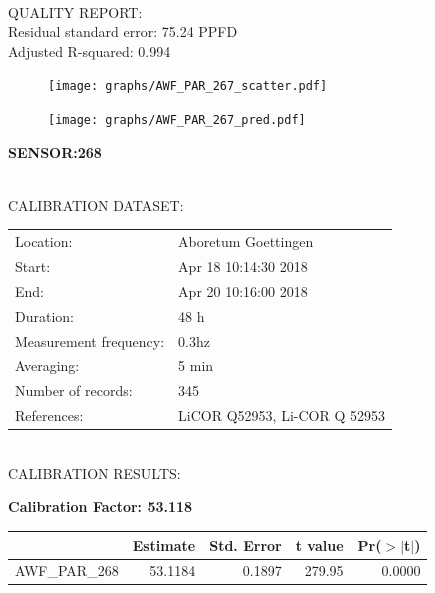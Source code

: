 \documentclass[oneside]{report}
\begin{document}
\hrulefill\\
QUALITY REPORT:\\
Residual standard error: 75.24 PPFD\\
Adjusted R-squared: 0.994



\begin{figure}[H]
  \centering
  \texttt{[image: graphs/AWF\_PAR\_267\_scatter.pdf]}
\end{figure}




\begin{figure}[H]
  \centering
  \texttt{[image: graphs/AWF\_PAR\_267\_pred.pdf]}
\end{figure}

\pagebreak


\begin{center}
\large{\textbf{SENSOR:268}}\\
\end{center}

\hrulefill\\
CALIBRATION DATASET:\\
\begin{table}[h!]
  \centering
  \label{tab:table1}
  \begin{tabular}{ll}
    Location: & Aboretum Goettingen\\ 
    
    
    Start:  & Apr 18 10:14:30 2018 \\
    End:   & Apr 20 10:16:00 2018\\ 
    Duration: & 48 h\\
    Measurement frequency: & 0.3hz\\
    Averaging:  &5 min\\
    Number of records: & 345 \\
    References: & LiCOR Q52953, Li-COR Q 52953 \\
  \end{tabular}
\end{table}

\hrulefill\\
CALIBRATION RESULTS:\\


\begin{center}
\textbf{\large{Calibration Factor: 53.118}}\\
\end{center}
\begin{table}[ht]
\centering
\begin{tabular}{rrrrr}
  \hline
 & Estimate & Std. Error & t value & Pr($>$$|$t$|$) \\ 
  \hline
AWF\_PAR\_268 & 53.1184 & 0.1897 & 279.95 & 0.0000 \\ 
   \hline
\end{tabular}
\end{table}
\end{document}
